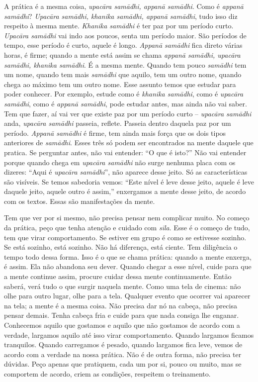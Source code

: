 A prática é a mesma coisa, \textit{upacāra samādhi, appanā
samādhi}. Como é \textit{appanā samādhi}?\textit{ Upacāra
samādhi, khanika samādhi, appanā samādhi}, tudo isso diz
respeito à mesma mente. \textit{Khanika samādhi} é ter paz por um
período curto. \textit{Upacāra samādhi} vai indo aos poucos, senta
um período maior. São períodos de tempo, esse período é curto, aquele é
longo. \textit{Appanā samādhi} fica direto várias horas, é firme;
quando a mente está assim se chama \textit{appanā samādhi,
upacāra samādhi, khanika samādhi}. É a mesma mente. Quando tem
pouco \textit{samādhi} tem um nome, quando tem mais
\textit{samādhi} que aquilo, tem um outro nome, quando chega ao
máximo tem um outro nome. Esse assunto temos que estudar para poder
conhecer. Por exemplo, estude como é \textit{khanika samādhi}, como é
\textit{upacāra samādhi}, como é \textit{appanā samādhi}, pode
estudar antes, mas ainda não vai saber. Tem que fazer, aí vai ver que
existe paz por um período curto – \textit{upacāra samādhi} anda,
\textit{upacāra samādhi} passeia, reflete. Passeia dentro daquela
paz por um período. \textit{Appanā samādhi} é firme, tem ainda mais
força que os dois tipos anteriores de \textit{samādhi}. Esses três só
podem ser encontrados na mente daquele que pratica. Se perguntar antes,
não vai entender: “O que é isto?” Não vai entender porque quando chega
em \textit{upacāra samādhi} não surge nenhuma placa com os dizeres:
“Aqui é \textit{upacāra samādhi}”, não aparece desse jeito. Só as
características são visíveis. Se temos sabedoria vemos: “Este nível é
leve desse jeito, aquele é leve daquele jeito, aquele outro é assim,”
enxergamos a mente desse jeito, de acordo com os textos. Essas são
manifestações da mente. 

Tem que ver por si mesmo, não precisa pensar nem complicar muito. No
começo da prática, peço que tenha atenção e cuidado com
\textit{sīla}. Esse é o começo de tudo, tem que virar comportamento.
Se estiver em grupo é como se estivesse sozinho. Se está sozinho, está
sozinho. Não há diferença, está ciente. Tem diligência o tempo todo
dessa forma. Isso é o que se chama prática: quando a mente enxerga, é
assim. Ela não abandona seu dever. Quando chegar a esse nível, cuide
para que a mente continue assim, procure cuidar dessa mente
continuamente. Então saberá, verá tudo o que surgir naquela mente. Como
uma tela de cinema: não olhe para outro lugar, olhe para a tela.
Qualquer evento que ocorrer vai aparecer na tela; a mente é a mesma
coisa. Não precisa dar nó na cabeça, não precisa pensar demais. Tenha
cabeça fria e cuide para que nada consiga lhe enganar. Conhecemos
aquilo que gostamos e aquilo que não gostamos de acordo com a verdade,
largamos aquilo até isso virar comportamento. Quando largamos ficamos
tranquilos. Quando carregamos é pesado, quando largamos fica leve,
vemos de acordo com a verdade na nossa prática. Não é de outra forma,
não precisa ter dúvidas. Peço apenas que pratiquem, cada um por si,
pouco ou muito, mas se comportem de acordo, criem as condições,
respeitem o treinamento. 


